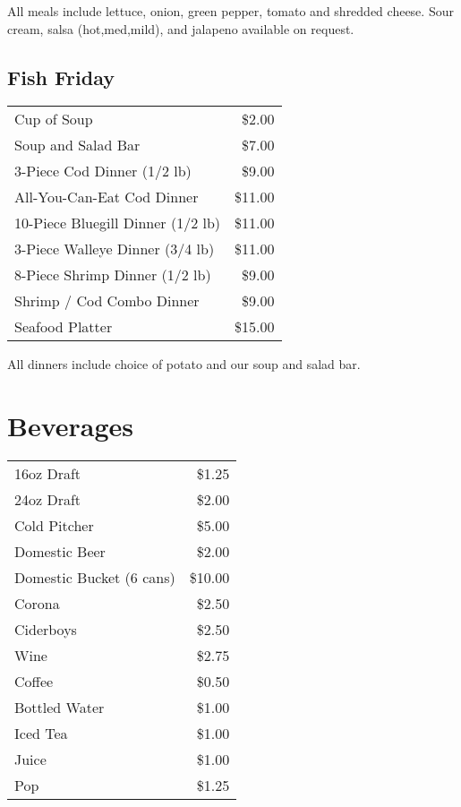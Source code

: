 \documentclass[a0,landscape]{a0poster}
\begin{document}
\begin{multicols}{4}
\vspace{1cm}

All meals include lettuce, onion, green pepper, tomato and shredded cheese. Sour cream, salsa (hot,med,mild), and jalapeno available on request.


\subsection*{Fish Friday}
\begin{center}
\begin{tabular}{ l r }
Cup of Soup & \$2.00 \\ 
Soup and Salad Bar & \$7.00 \\
3-Piece Cod Dinner (1/2 lb) & \$9.00 \\
All-You-Can-Eat Cod Dinner & \$11.00 \\
10-Piece Bluegill Dinner (1/2 lb) & \$11.00 \\
3-Piece Walleye Dinner (3/4 lb) & \$11.00 \\
8-Piece Shrimp Dinner (1/2 lb) & \$9.00 \\
Shrimp / Cod Combo Dinner & \$9.00 \\
Seafood Platter & \$15.00 \\
\end{tabular}
\end{center}

\vspace{1cm}

All dinners include choice of potato and our soup and salad bar.


\color{DarkSlateGray} %

\section*{Beverages}

\begin{center}
\begin{tabular}{ l r }
16oz Draft & \$1.25 \\
24oz Draft & \$2.00 \\
Cold Pitcher & \$5.00 \\
Domestic Beer & \$2.00 \\
Domestic Bucket (6 cans) & \$10.00 \\
Corona & \$2.50 \\
Ciderboys & \$2.50 \\
Wine & \$2.75 \\
Coffee & \$0.50 \\
Bottled Water & \$1.00 \\
Iced Tea & \$1.00 \\
Juice & \$1.00 \\
Pop & \$1.25 \\
\end{tabular}
\end{center}


\end{multicols}
\end{document}
